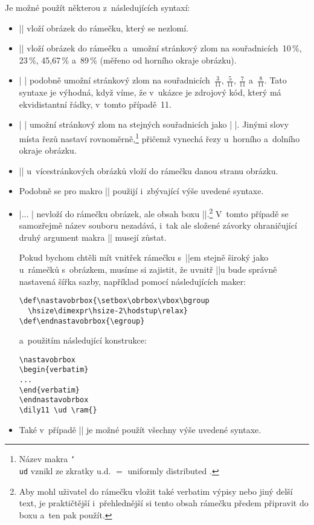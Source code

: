 \documentclass{csbulletin}
\def\p#1{\texttt{\char`\\#1}}
\def\uv#1{\char18 #1\char16 }
\begin{document}
Je možné použít některou z~následujících syntaxí:
\begin{itemize}
\item || vloží obrázek do rámečku, který se nezlomí.
\item || vloží obrázek do rámečku a~umožní stránkový zlom na souřadnicích~10\,\%, 23\,\%, 45,67\,\% a~89\,\% (měřeno od horního okraje obrázku).
\item | | podobně umožní stránkový zlom na souřadnicích~$\frac{3}{11}$, $\frac{5}{11}$, $\frac{7}{11}$ a~$\frac{8}{11}$. Tato syntaxe je výhodná, když víme, že v~ukázce je zdrojový kód, který má ekvidistantní řádky, v~tomto případě~11.
\item | \ud {}| umožní stránkový zlom na stejných souřadnicích jako | |. Jinými slovy místa řezů nastaví rovnoměrně,\footnote{Název makra \p{ud} vznikl ze zkratky \uv{u.d.}${}={}$\uv{uniformly distributed}.} přičemž vynechá řezy u~horního a~dolního okraje obrázku.
\item || u~vícestránkových obrázků vloží do rámečku danou stranu obrázku.
\item Podobně se pro makro |\Ram| použijí i~zbývající výše uvedené syntaxe.
\item |\setbox\obrbox\vbox{...} | nevloží do rámečku obrázek, ale obsah boxu |\obrbox|.\footnote{Aby mohl uživatel do rámečku vložit také verbatim výpisy nebo jiný delší text, je praktičtější i~přehlednější si tento obsah rámečku předem připravit do boxu a~ten pak použít.} V~tomto případě se samozřejmě název souboru nezadává, i~tak ale složené závorky ohraničující druhý argument makra |\ram| musejí zůstat.

Pokud bychom chtěli mít vnitřek rámečku s~|\obrbox|em stejně široký jako u~rámečků s~obrázkem, musíme si zajistit, že uvnitř |\vbox|u bude správně nastavená šířka sazby, například pomocí následujících maker:
\begin{Verbatim}[numbers=none]
\def\nastavobrbox{\setbox\obrbox\vbox\bgroup
  \hsize\dimexpr\hsize-2\hodstup\relax}
\def\endnastavobrbox{\egroup}
\end{Verbatim}
a~použitím následující konstrukce:
\begin{Verbatim}[numbers=none]
\nastavobrbox
\begin{verbatim}
...
\end{verbatim}
\endnastavobrbox
\dily11 \ud \ram{}
\end{Verbatim}
\item Také v~případě |\setbox\obrbox| je možné použít všechny výše uvedené syntaxe.
\end{itemize}
\end{document}
